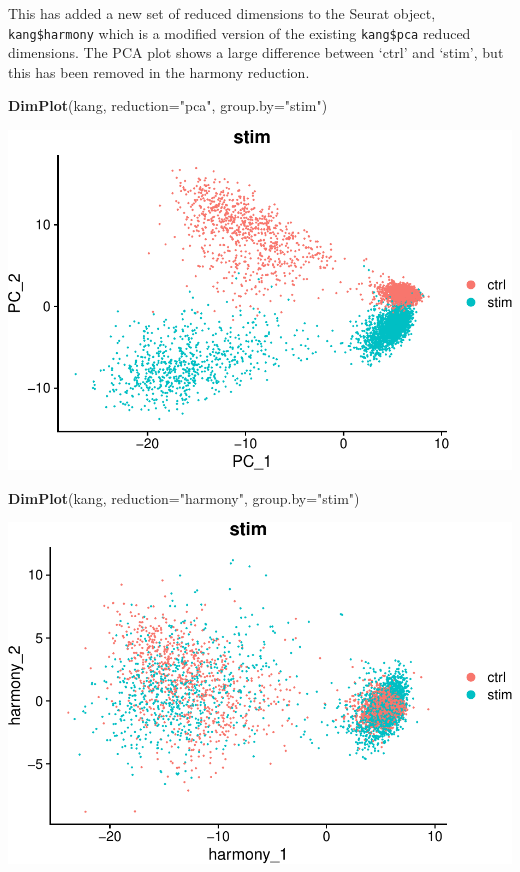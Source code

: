\documentclass[
]{book}
\newenvironment{Shaded}{\begin{snugshade}}{\end{snugshade}}
\newcommand{\AttributeTok}[1]{\textcolor[rgb]{0.13,0.29,0.53}{#1}}
\newcommand{\FunctionTok}[1]{\textcolor[rgb]{0.13,0.29,0.53}{\textbf{#1}}}
\newcommand{\NormalTok}[1]{#1}
\newcommand{\StringTok}[1]{\textcolor[rgb]{0.31,0.60,0.02}{#1}}
\begin{document}
This has added a new set of reduced dimensions to the Seurat object, \texttt{kang\$harmony} which is a modified version of the existing \texttt{kang\$pca} reduced dimensions. The PCA plot shows a large difference between `ctrl' and `stim', but this has been removed in the harmony reduction.

\begin{Shaded}
\begin{Highlighting}[]
\FunctionTok{DimPlot}\NormalTok{(kang, }\AttributeTok{reduction=}\StringTok{"pca"}\NormalTok{, }\AttributeTok{group.by=}\StringTok{"stim"}\NormalTok{)}
\end{Highlighting}
\end{Shaded}

\includegraphics{scRNAseqInR_Doco_files/figure-latex/unnamed-chunk-69-1.pdf}

\begin{Shaded}
\begin{Highlighting}[]
\FunctionTok{DimPlot}\NormalTok{(kang, }\AttributeTok{reduction=}\StringTok{"harmony"}\NormalTok{, }\AttributeTok{group.by=}\StringTok{"stim"}\NormalTok{)}
\end{Highlighting}
\end{Shaded}

\includegraphics{scRNAseqInR_Doco_files/figure-latex/unnamed-chunk-69-2.pdf}
\end{document}
